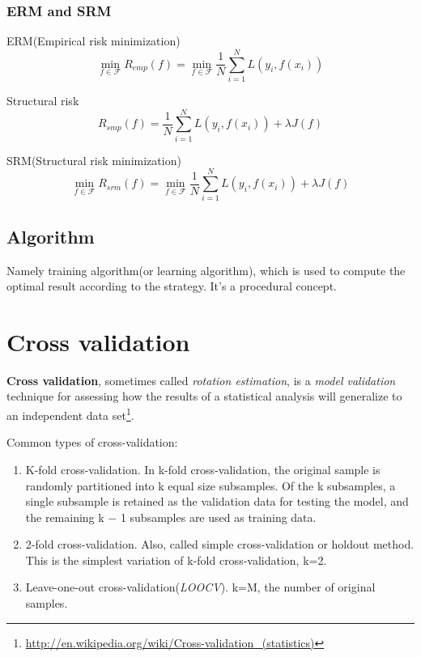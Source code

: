 \subsubsection{ERM and SRM}
\begin{definition}
ERM(Empirical risk minimization)
\begin{equation}
\min\limits _{f \in \mathcal{F}} R_{emp}(f)=\min\limits _{f \in \mathcal{F}} \dfrac{1}{N}\sum\limits_{i=1}^{N} L\left(y_i,f(x_i)\right)
\end{equation}
\end{definition}

\begin{definition}
Structural risk
\begin{equation}
R_{smp}(f)=\dfrac{1}{N}\sum\limits_{i=1}^{N} L\left(y_i,f(x_i)\right) +\lambda J(f)
\end{equation}
\end{definition}

\begin{definition}
SRM(Structural risk minimization)
\begin{equation}
\min\limits _{f \in \mathcal{F}} R_{srm}(f)=\min\limits _{f \in \mathcal{F}} \dfrac{1}{N}\sum\limits_{i=1}^{N} L\left(y_i,f(x_i)\right) +\lambda J(f)
\end{equation}
\end{definition}

\subsection{Algorithm}
Namely training algorithm(or learning algorithm), which is used to compute the optimal result according to the strategy. It's a procedural concept.

\section{Cross validation}
\begin{definition}
\textbf{Cross validation}, sometimes called \emph{rotation estimation}, is a \emph{model validation} technique for assessing how the results of a statistical analysis will generalize to an independent data set\footnote{\url{http://en.wikipedia.org/wiki/Cross-validation_(statistics)}}.
\end{definition}

Common types of cross-validation:
\begin{enumerate}
\item K-fold cross-validation. In k-fold cross-validation, the original sample is randomly partitioned into k equal size subsamples. Of the k subsamples, a single subsample is retained as the validation data for testing the model, and the remaining k − 1 subsamples are used as training data.
\item 2-fold cross-validation. Also, called simple cross-validation or holdout method. This is the simplest variation of k-fold cross-validation, k=2.
\item Leave-one-out cross-validation(\emph{LOOCV}). k=M, the number of original samples.
\end{enumerate}

